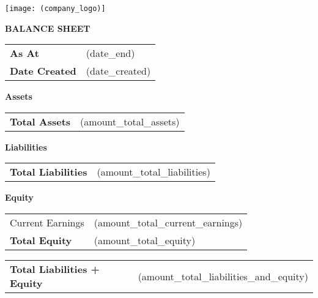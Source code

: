 \documentclass[english]{article}
\providecommand{\tabularnewline}{\\}
\begin{document}
\noindent \texttt{[image: (company\_logo)]}

\noindent \vspace{10mm}



\noindent \textbf{BALANCE SHEET}

\noindent \vspace{10mm}


\noindent \begin{tabular}{ll}
\textbf{As At} & (date\_end) \tabularnewline
\textbf{Date Created} & (date\_created) \tabularnewline
\end{tabular}

\noindent \vspace{10mm}

\noindent \textbf{Assets}

\noindent \begin{tabular}{>{\raggedright}p{}>{\raggedright}p{}}
\cline{2-2} 
\textbf{Total Assets} & (amount\_total\_assets)\tabularnewline
\end{tabular}

\noindent \vspace{5mm}


\noindent \textbf{Liabilities}

\noindent \begin{tabular}{>{\raggedright}p{}>{\raggedright}p{}}
\cline{2-2} 
\textbf{Total Liabilities} & (amount\_total\_liabilities)\tabularnewline
\end{tabular}

\noindent \vspace{5mm}


\noindent \textbf{Equity}

\noindent \begin{tabular}{>{\raggedright}p{}>{\raggedright}p{}}
Current Earnings & (amount\_total\_current\_earnings)\tabularnewline
\cline{2-2} 
\textbf{Total Equity} & (amount\_total\_equity)\tabularnewline
\end{tabular}

\noindent \vspace{5mm}


\noindent \begin{tabular}{>{\raggedright}p{}>{\raggedright}p{}}
\textbf{Total Liabilities + Equity} & (amount\_total\_liabilities\_and\_equity)\tabularnewline
\end{tabular}
\end{document}
